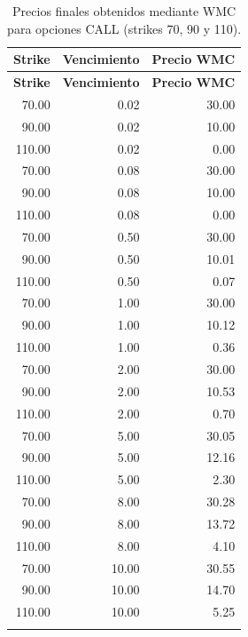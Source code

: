 \begin{longtable}{|r|r|r|}
\hline
\textbf{Strike} & \textbf{Vencimiento} & \textbf{Precio WMC} \\ \hline
\endfirsthead
\hline
\textbf{Strike} & \textbf{Vencimiento} & \textbf{Precio WMC} \\ \hline
\endhead
70.00  & 0.02  & 30.00 \\ \hline
90.00  & 0.02  & 10.00 \\ \hline
110.00 & 0.02  & 0.00 \\ \hline
70.00  & 0.08  & 30.00 \\ \hline
90.00  & 0.08  & 10.00 \\ \hline
110.00 & 0.08  & 0.00 \\ \hline
70.00  & 0.50  & 30.00 \\ \hline
90.00  & 0.50  & 10.01 \\ \hline
110.00 & 0.50  & 0.07 \\ \hline
70.00  & 1.00  & 30.00 \\ \hline
90.00  & 1.00  & 10.12 \\ \hline
110.00 & 1.00  & 0.36 \\ \hline
70.00  & 2.00  & 30.00 \\ \hline
90.00  & 2.00  & 10.53 \\ \hline
110.00 & 2.00  & 0.70 \\ \hline
70.00  & 5.00  & 30.05 \\ \hline
90.00  & 5.00  & 12.16 \\ \hline
110.00 & 5.00  & 2.30 \\ \hline
70.00  & 8.00  & 30.28 \\ \hline
90.00  & 8.00  & 13.72 \\ \hline
110.00 & 8.00  & 4.10 \\ \hline
70.00  & 10.00 & 30.55 \\ \hline
90.00  & 10.00 & 14.70 \\ \hline
110.00 & 10.00 & 5.25 \\ \hline
\caption{Precios finales obtenidos mediante WMC para opciones CALL (strikes 70, 90 y 110).}\label{tab:wmc_precios_70_90_110}\\
\end{longtable}
